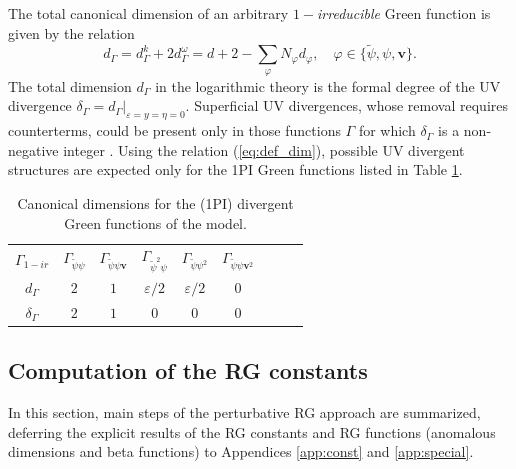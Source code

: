 \documentclass[aps,pre,url,twocolumn,superscriptaddress]{revtex4-1}
\def\eps{\varepsilon}
\def\mv{{\bm v}}
\begin{document}
The total canonical dimension of an arbitrary $1-${\it irreducible} Green function
is given by the relation
\begin{equation}
   d_\Gamma = d^k_\Gamma + 2 d^\omega_\Gamma = d + 2 - \sum_\varphi N_\varphi d_\varphi, \quad 
   \varphi\in\{\tilde{\psi}, \psi, \mv \}.
   \label{eq:def_dim}
\end{equation}
The total dimension $d_\Gamma$ in the logarithmic theory is the formal degree of the 
UV divergence $\delta_\Gamma = d_\Gamma |_{\eps=y=\eta=0}$. 
Superficial UV divergences, whose removal requires counterterms, could be
present only in those functions $\Gamma$ for which $\delta_\Gamma$ is
a non-negative integer \cite{Vasiliev}.
Using the relation (\ref{eq:def_dim}), possible UV divergent structures
are expected only for the 1PI Green functions listed in
Table \ref{tab:canon_green}.
\begin{table}
  \caption{Canonical dimensions for the (1PI) divergent Green functions of the model.}
  \label{tab:canon_green}%
  \begin{tabular}{|c|c|c|c|c|c|c|c|c|}
    \hline\noalign{\smallskip}
    $\Gamma_{1-ir}$ &  $\Gamma_{\tilde{\psi} \psi} $& $\Gamma_{\tilde{\psi} \psi \mv }$
                  & $\Gamma_{\tilde{\psi}^2 \psi} $ & $ \Gamma_{\tilde{\psi}\psi^2} $
                  & $\Gamma_{\tilde{\psi}\psi \mv^2}$                                    
   \\
    \noalign{\smallskip}\hline\noalign{\smallskip}
    $d_\Gamma$ & $2$ & $1$ & $\eps/2$ & $\eps/2$ & $0$
               \\
     \noalign{\smallskip}\hline\noalign{\smallskip}
     $\delta_\Gamma$ & $2$ & $1$ & $0$ & $0$ & $0$
               \\ \hline
  \end{tabular}
\end{table}


\subsection{Computation of the RG constants \label{sec:RG_const}}
%
% 
In this section, main steps of the perturbative RG approach are
summarized, deferring the explicit results of
the RG constants and RG functions (anomalous dimensions and
beta functions) to Appendices \ref{app:const} and \ref{app:special}.
\end{document}
